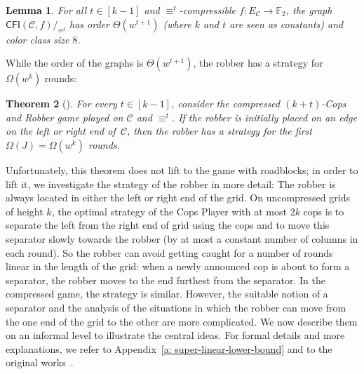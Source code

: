 \documentclass[10pt,a4paper]{article}
\newcommand{\comp}{\equiv}
\newcommand{\CFIsym}{\mathsf{CFI}}
\newcommand{\CFI}[1]{\CFIsym(#1)}
\newcommand{\compCFI}[2]{\CFI{#1}/_{#2}}
\newcommand{\FF}{\mathbb{F}}
\newcommand{\grid}{\mathcal{C}}
\newcommand{\edgeC}{E_{\mathcal{C}}}
\newtheorem{theorem}{Theorem}
\newtheorem{lemma}[theorem]{Lemma}
\newcommand{\confORfull}[2]{#1}
\newcommand{\ifAppendix}[1]{#1}
\begin{document}
\begin{lemma}
        \label{lem:compression-size}
        For all $t \in [k-1]$ and $\comp^t$-compressible $f \colon \edgeC \to \FF_2$,
        the graph $\compCFI{\grid,f}{\comp^t}$ has order $\Theta(w^{t+1})$
        (where $k$ and $t$ are seen as constants) and color class size $8$.
\end{lemma}
\confORfull{}{
        \begin{proof}
                Let $t \in [k-1]$ and $i\in[k]$.
                In the $i$-th row, there are $f(k)p_i \cdot \ldots \cdot p_{i+t} + 2f(k) = \Theta(w^{t+1})$
                equivalence classes.
                Since only vertices in the same row are $\comp^t$-equivalence,
                there are $\Theta(w^{t+1})$ equivalence classes in total.
                Since all vertices in the cylindrical grid $\grid$ have degree at most $4$,
                for every $\comp^t$-equivalence class there are at most $8$ vertices added
                to $\compCFI{\grid,f}{\comp^t}$ (namely one CFI gadget of degree at most $4$).
                Hence, $\compCFI{\grid,f}{\comp^t}$ has order $\Theta(w^{t+1})$.
\end{proof}
}

\noindent While the order of the graphs is $\Theta(w^{t+1})$,
the robber has a strategy for  $\Omega(w^k)$ rounds:

\begin{theorem}[\cite{RFJN024}]
        \label{thm:compressed-lower-bound}
        For every $t \in [k-1]$, consider the compressed $(k+t)$-Cops and Robber game
        played on $\grid$ and $\comp^t$.
        If the robber is initially placed on an edge on the left or right end of~$\grid$,
        then the robber has a strategy for the first $\Omega(J)=\Omega(w^k)$ rounds.
\end{theorem}

\noindent Unfortunately, this theorem does not lift to the game with roadblocks; in order to lift it, we investigate the strategy of the robber in more detail: The robber is always located in either  the left or right end of the grid.
On uncompressed grids of height $k$, the optimal strategy of the Cops Player with at most $2k$ cops is to separate the left from the right end of grid using the cops and to move this separator slowly towards the robber (by at most a constant number of columns in each round).
So the robber can avoid getting caught for a number of rounds linear in the length of the grid: when a newly announced cop is about to form a separator, the robber moves to the end furthest from the separator.
In the compressed game, the strategy is similar.
However, the suitable notion of a separator and the analysis of the situations in which the robber can move from the one end of the grid to the other are more complicated.
We now describe them on an informal level to illustrate the central ideas.
For formal details and more explanations, we refer to \ifAppendix{Appendix~\ref{a: super-linear-lower-bound} and to }the original works~\cite{RFJN024,DBLP:conf/focs/GroheLNS23}.
\end{document}

